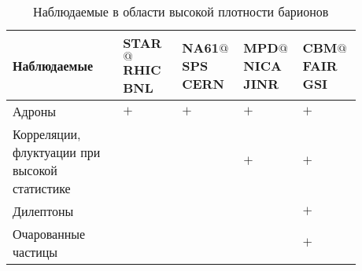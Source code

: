 





\begin{table}[H]
\caption{Наблюдаемые в области высокой плотности барионов}
\label{tabl:Experiments2}
\begin{tabular}{ | p{0.28\linewidth} | p{0.15\linewidth} | p{0.15\linewidth} | p{0.15\linewidth} | p{0.15\linewidth} | }
\hline
\textbf{Наблюдаемые} & \textbf{STAR$@$RHIC} \newline \textbf{BNL} & \textbf{NA61$@$SPS} \newline \textbf{CERN} & \textbf{MPD$@$NICA} \newline \textbf{JINR} & \textbf{CBM$@$FAIR} \newline \textbf{GSI} \\
\hline
Адроны & $+$ & $+$ & $+$ & $+$ \\
\hline
Корреляции, флуктуации \newline при высокой статистике & & & $+$ & $+$ \\
\hline
Дилептоны & & & & $+$ \\
\hline
Очарованные \newline частицы & & & & $+$ \\
\hline
\end{tabular}
\end{table}

